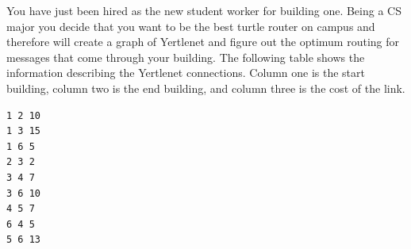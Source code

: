 \documentclass[11pt]{exam}
\begin{document}
\begin{questions}
You have just been hired as the new student worker for building one. Being a CS major you decide that you want to be the best turtle router on campus and therefore will create a graph of Yertlenet and figure out the optimum routing for messages that come through your building. The following table shows the information describing the Yertlenet connections. Column one is the start building, column two is the end building, and column three is the cost of the link.

\begin{verbatim}
1 2 10
1 3 15
1 6 5
2 3 2
3 4 7
3 6 10
4 5 7
6 4 5
5 6 13
\end{verbatim}





\end{questions}
\end{document}

